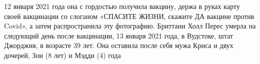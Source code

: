 12 января 2021 года она с гордостью получила вакцину, держа в руках карту своей
вакцинации со слоганом «СПАСИТЕ ЖИЗНИ, скажите ДА вакцине против Covid», а затем
распространила эту фотографию. Бриттани Холл Перес умерла на следующий день
после вакцинации, 13 января 2021 года, в Вудстоке, штат Джорджия, в возрасте 39
лет. Она оставила после себя мужа Криса и двух дочерей, Зои (8 лет) и Мэдди (4)
года

